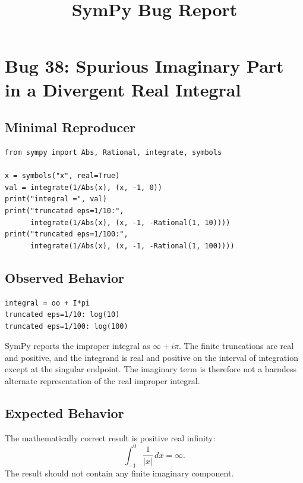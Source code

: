 \documentclass[11pt]{article}
\title{SymPy Bug Report}
\author{}
\date{}
\begin{document}
\setlength{\emergencystretch}{2em}

\maketitle

\section{Bug 38: Spurious Imaginary Part in a Divergent Real Integral}

\subsection{Minimal Reproducer}

\medskip

\begin{lstlisting}[style=bugpython]
from sympy import Abs, Rational, integrate, symbols

x = symbols("x", real=True)
val = integrate(1/Abs(x), (x, -1, 0))
print("integral =", val)
print("truncated eps=1/10:",
      integrate(1/Abs(x), (x, -1, -Rational(1, 10))))
print("truncated eps=1/100:",
      integrate(1/Abs(x), (x, -1, -Rational(1, 100))))
\end{lstlisting}

\subsection{Observed Behavior}

\medskip

\begin{lstlisting}[style=bugpython]
integral = oo + I*pi
truncated eps=1/10: log(10)
truncated eps=1/100: log(100)
\end{lstlisting}

SymPy reports the improper integral as \(\infty + i\pi\).  The finite
truncations are real and positive, and the integrand is real and positive on
the interval of integration except at the singular endpoint.  The imaginary
term is therefore not a harmless alternate representation of the real
improper integral.

\subsection{Expected Behavior}

The mathematically correct result is positive real infinity:
\[
  \int_{-1}^{0} \frac{1}{|x|}\,dx = \infty.
\]
The result should not contain any finite imaginary component.
\end{document}
